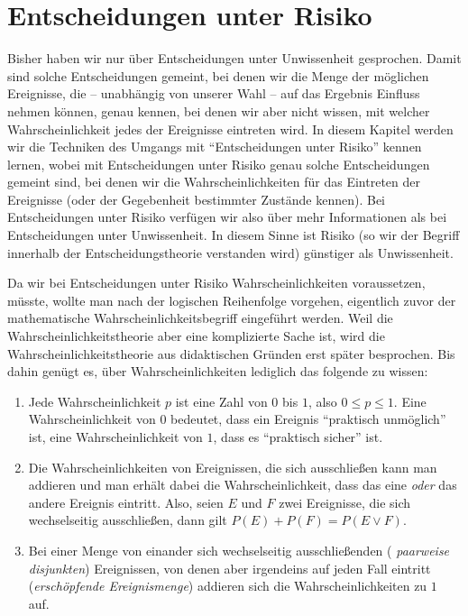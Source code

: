 \section{Entscheidungen unter Risiko}
\label{Risiko}

Bisher haben wir nur über Entscheidungen unter Unwissenheit gesprochen. Damit
sind solche Entscheidungen gemeint, bei denen wir die Menge der möglichen
Ereignisse, die -- unabhängig von unserer Wahl -- auf das Ergebnis Einfluss
nehmen können, genau kennen, bei denen wir aber nicht wissen, mit welcher
Wahrscheinlichkeit jedes der Ereignisse eintreten wird. In diesem Kapitel
werden wir die Techniken des Umgangs mit "`Entscheidungen unter Risiko"' kennen
lernen, wobei mit Entscheidungen unter Risiko genau solche Entscheidungen
gemeint sind, bei denen wir die Wahrscheinlichkeiten für das Eintreten der
Ereignisse (oder der Gegebenheit bestimmter Zustände kennen). Bei
Entscheidungen unter Risiko verfügen wir also über mehr Informationen als bei
Entscheidungen unter Unwissenheit. In diesem Sinne ist Risiko (so wir der
Begriff innerhalb der Entscheidungstheorie verstanden wird) günstiger als
Unwissenheit. 

Da wir bei Entscheidungen unter Risiko Wahrscheinlichkeiten voraussetzen, müsste,
wollte man nach der logischen Reihenfolge vorgehen, eigentlich zuvor der
mathematische Wahrscheinlichkeitsbegriff eingeführt werden. Weil die
Wahrscheinlichkeitstheorie aber eine komplizierte Sache ist, wird die
Wahrscheinlichkeitstheorie aus didaktischen Gründen erst später besprochen. Bis
dahin genügt es, über Wahrscheinlichkeiten lediglich das folgende zu wissen:

\begin{enumerate}
  \item Jede Wahrscheinlichkeit $p$ ist eine Zahl von $0$ bis $1$, also $ 0
  \leq p \leq 1$. Eine Wahrscheinlichkeit von $0$ bedeutet, dass ein Ereignis
  "`praktisch unmöglich"' ist, eine Wahrscheinlichkeit von $1$, dass es
  "`praktisch sicher"' ist.
  \item Die Wahrscheinlichkeiten von Ereignissen, die sich ausschließen kann
  man addieren und man erhält dabei die Wahrscheinlichkeit, dass das eine {\em
  oder} das andere Ereignis eintritt. Also, seien $E$ und $F$ zwei Ereignisse,
  die sich wechselseitig ausschließen, dann gilt $P(E) + P(F) = P(E \vee F)$.
  \item Bei einer Menge von einander sich wechselseitig ausschließenden ({\em
  paarweise disjunkten}) Ereignissen, von denen aber irgendeins auf jeden Fall
  eintritt ({\em erschöpfende Ereignismenge}) addieren sich die
  Wahrscheinlichkeiten zu $1$ auf. 
\end{enumerate}


